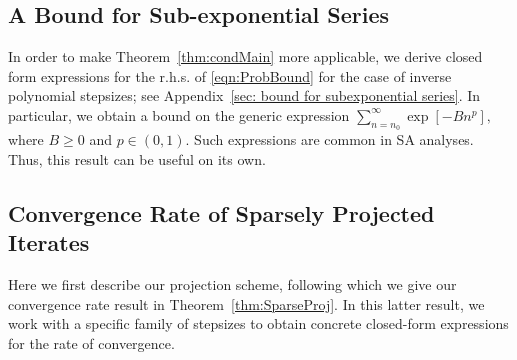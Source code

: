 \documentclass[usenames,dvipsnames,final,12pt]{colt2018} %
\newcommand{\lt}{q_1}
\newcommand{\et}{\epsilon_1}
\newcommand{\lz}{q_2}
\newcommand{\ez}{\epsilon_2}
\newcommand{\gugan}[1]{#1}
\begin{document}


\subsection{\gugan{A Bound for Sub-exponential Series}}

In order to make Theorem~\ref{thm:condMain} more applicable, we derive closed form expressions for the r.h.s. of \eqref{eqn:ProbBound} for the case of inverse polynomial stepsizes; see Appendix~\ref{sec: bound for subexponential series}. In particular, we obtain a bound on the generic expression $\sum_{n = n_0}^{\infty} \exp[- B n^{p}],$ where $B \geq 0$ and $p \in (0,1).$  Such expressions are common in SA analyses. Thus, this result can be useful on its own.

\subsection{Convergence Rate of Sparsely Projected Iterates}
%
\gugan{Here we first describe our projection scheme, following which we give our convergence rate result in Theorem~\ref{thm:SparseProj}. In this latter result, we work with a specific family of stepsizes to obtain concrete closed-form expressions for the rate of convergence.}
\end{document}
